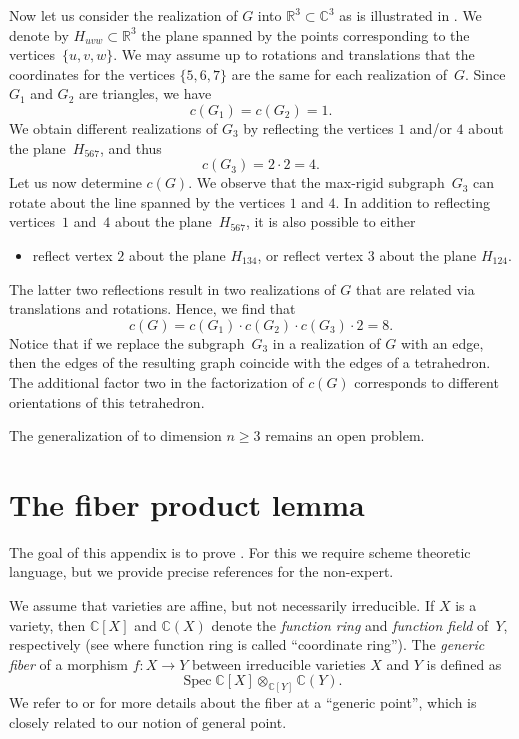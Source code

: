\documentclass[12pt]{article}
\theoremstyle{definition}
\newenvironment{Mlist}{\begin{itemize}[topsep=0pt,itemsep=0pt,leftmargin=7mm]}{\end{itemize}}
\newcommand{\df}[1]{{\it #1}}
\renewcommand{\c}{\colon}
\newcommand{\C}{{\mathbb{C}}}
\newcommand{\R}{{\mathbb{R}}}
\newcommand{\Spec}{\operatorname{Spec}}
\begin{document}
Now let us consider the realization of $G$ into $\R^3\subset\C^3$ as is illustrated in .
We denote by $H_{uvw}\subset \R^3$ the plane spanned by the points corresponding to the vertices~$\{u,v,w\}$.
We may assume up to rotations and translations that the coordinates for the
vertices $\{5,6,7\}$ are the same for each realization of~$G$.
Since $G_1$ and $G_2$ are triangles, we have
\[
c(G_1)=c(G_2)=1.
\]
We obtain different realizations of $G_3$ by reflecting the vertices $1$ and/or $4$ about the plane~$H_{567}$,
and thus
\[
c(G_3)=2\cdot 2=4.
\]
Let us now determine $c(G)$.
We observe that the max-rigid subgraph~$G_3$ can rotate about the line spanned
by the vertices $1$ and $4$.
In addition to reflecting vertices~$1$ and~$4$
about the plane~$H_{567}$, it is also possible to either
\begin{Mlist}
\item reflect vertex $2$ about the plane $H_{134}$, or reflect vertex $3$ about the plane $H_{124}$.
\end{Mlist}
The latter two reflections result in two realizations
of $G$ that are related via translations and rotations.
Hence, we find that
\[
c(G)=c(G_1)\cdot c(G_2)\cdot c(G_3)\cdot 2=8.
\]
Notice that if we replace the subgraph~$G_3$ in a realization of $G$ with an edge, then the edges of the
resulting graph coincide with the edges of a tetrahedron.
The additional factor two in the factorization of $c(G)$ corresponds to different orientations of this tetrahedron.

The generalization of  to dimension $n\geq 3$ remains an open problem.

\appendix
\addappheadtotoc

\section{The fiber product lemma}
\label{sec:fiber}

The goal of this appendix is to prove .
For this we require scheme theoretic language, but
we provide precise references for the non-expert.


We assume that varieties are affine, but not necessarily irreducible.
If $X$ is a variety,
then $\C[X]$ and $\C(X)$ denote the \df{function ring}
and \df{function field} of~$Y$, respectively
(see \citep[pages~4 and 16]{1977} where function ring is called ``coordinate ring'').
The \df{generic fiber} of a morphism $f\c X\to Y$ between irreducible varieties $X$ and $Y$
is defined as
\[
\Spec \C[X]\otimes_{\C[Y]}\C(Y).
\]
We refer to \citep[pages~xvi, 16, 87 and 89, and Exercise~II.2.7 at page~80]{1977}
or \citep[Definition~1.5 in Chapter~3]{2002L}
for more details about the fiber at a ``generic point'',
which is closely related to our notion of general point.
\end{document}

